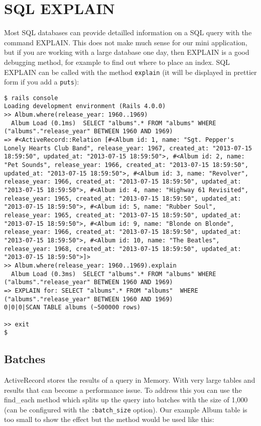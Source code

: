 \documentclass[a4paper]{book}
\newcounter{tab}[chapter]
\newcommand{\chap}[1]{\newpage\thispagestyle{empty}\chapter{#1}\label{chap:\thechapter}}
\begin{document}
\chap{SQL EXPLAIN}\label{sql-explain}

Most SQL databases can provide detailled information on a SQL query with the command EXPLAIN. This does not make much sense for our mini application, but if you are working with a large database one day, then EXPLAIN is a good debugging method, for example to find out where to place an index. SQL EXPLAIN can be called with the method \texttt{explain} (it will be displayed in prettier form if you add a \texttt{puts}):

\begin{shaded}\begin{verbatim}
$ rails console
Loading development environment (Rails 4.0.0)
>> Album.where(release_year: 1960..1969)
  Album Load (0.1ms)  SELECT "albums".* FROM "albums" WHERE ("albums"."release_year" BETWEEN 1960 AND 1969)
=> #<ActiveRecord::Relation [#<Album id: 1, name: "Sgt. Pepper's Lonely Hearts Club Band", release_year: 1967, created_at: "2013-07-15 18:59:50", updated_at: "2013-07-15 18:59:50">, #<Album id: 2, name: "Pet Sounds", release_year: 1966, created_at: "2013-07-15 18:59:50", updated_at: "2013-07-15 18:59:50">, #<Album id: 3, name: "Revolver", release_year: 1966, created_at: "2013-07-15 18:59:50", updated_at: "2013-07-15 18:59:50">, #<Album id: 4, name: "Highway 61 Revisited", release_year: 1965, created_at: "2013-07-15 18:59:50", updated_at: "2013-07-15 18:59:50">, #<Album id: 5, name: "Rubber Soul", release_year: 1965, created_at: "2013-07-15 18:59:50", updated_at: "2013-07-15 18:59:50">, #<Album id: 9, name: "Blonde on Blonde", release_year: 1966, created_at: "2013-07-15 18:59:50", updated_at: "2013-07-15 18:59:50">, #<Album id: 10, name: "The Beatles", release_year: 1968, created_at: "2013-07-15 18:59:50", updated_at: "2013-07-15 18:59:50">]>
>> Album.where(release_year: 1960..1969).explain
  Album Load (0.3ms)  SELECT "albums".* FROM "albums" WHERE ("albums"."release_year" BETWEEN 1960 AND 1969)
=> EXPLAIN for: SELECT "albums".* FROM "albums"  WHERE ("albums"."release_year" BETWEEN 1960 AND 1969)
0|0|0|SCAN TABLE albums (~500000 rows)

>> exit
$
\end{verbatim}\end{shaded}

\section{Batches}\label{batches}

ActiveRecord stores the results of a query in Memory. With very large tables and results that can become a performance issue. To address this you can use the find\_each method which splits up the query into batches with the size of 1,000 (can be configured with the \texttt{:batch\_size} option). Our example Album table is too small to show the effect but the method would be used like this:
\end{document}

